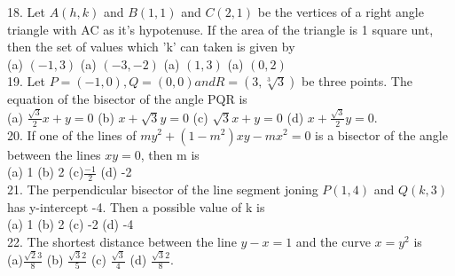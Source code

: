 \documentclass[12pt]{article}
\begin{document}
18. Let $A(h,k)$ and $B(1,1)$ and $C(2,1)$ be the vertices of a right angle triangle with AC as it's hypotenuse. If the area of the triangle is 1 square unt, then the set of values which 'k' can taken is given by\\
(a) $(-1,3)$ \hspace{1cm}(a) $(-3,-2)$\hspace{1cm} (a) $(1,3)$ \hspace{1cm}(a) $(0,2)$\\
19. Let $P=(-1,0),Q=(0,0) and R=(3,\sqrt[3]{3})$ be three points. The equation of the bisector of the angle PQR is \\
(a) $\frac{\sqrt{3}}{2}x+y=0$ \hspace{1cm} (b) $x+\sqrt{3}y=0$ \hspace{1cm} (c) $\sqrt{3}x+y=0$ \hspace{1cm}(d) $x+\frac{\sqrt{3}}{2}y=0$.\\
20. If one of the lines of $my^2+(1-m^2)xy-mx^2=0$ is a bisector of the angle between the lines $xy=0$, then m is\\
(a) 1  \hspace{1cm}(b) 2 \hspace{1cm} (c)$\frac{-1}{2}$  \hspace{1cm}(d) -2\\
21. The perpendicular bisector of the line segment joning $P(1,4)$ and $Q(k,3)$ has y-intercept -4. Then a possible value of k is\\
(a) 1 \hspace{1cm}(b) 2 \hspace{1cm}(c) -2 \hspace{1cm}(d) -4\\
22. The shortest distance between the line $y-x=1$ and the curve $x=y^2$ is \\

(a)$\frac{\sqrt{2}{3}}{8}$ \hspace{1cm} (b) $\frac{\sqrt{3}{2}}{5}$ \hspace{1cm} (c) $\frac{\sqrt{3}}{4}$ \hspace{1cm} (d) $\frac{\sqrt{3}{2}}{8}$.\\
\end{document}
